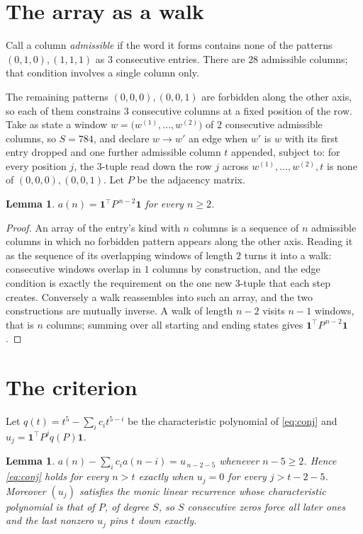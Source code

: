 \documentclass[11pt,a4paper]{article}
\theoremstyle{plain}
\newtheorem{lemma}[theorem]{Lemma}
\theoremstyle{definition}
\begin{document}
\section{The array as a walk}

Call a column \emph{admissible} if the word it forms contains none of the patterns
$(0,1,0), (1,1,1)$ as $3$ consecutive entries. There are $28$ admissible columns; that condition
involves a single column only.

The remaining patterns $(0,0,0), (0,0,1)$ are forbidden along the other axis, so each of them
constrains $3$ consecutive columns at a fixed position of the row. Take as state a
window $w=\bigl(w^{(1)},\dots,w^{(2)}\bigr)$ of $2$ consecutive admissible
columns, so $S=784$, and declare $w\to w'$ an edge when $w'$ is $w$ with its first entry
dropped and one further admissible column $t$ appended, subject to: for every position
$j$, the $3$-tuple read down the row $j$ across $w^{(1)},\dots,w^{(2)},t$
is none of $(0,0,0), (0,0,1)$. Let $P$ be the adjacency matrix.

\begin{lemma}\label{lem:walk}
$a(n)=\mathbf{1}^{\!\top}P^{\,n-2}\mathbf{1}$ for every $n\ge2$.
\end{lemma}

\begin{proof}
An array of the entry's kind with $n$ columns is a sequence of $n$ admissible columns in
which no forbidden pattern appears along the other axis. Reading it as the sequence of its
overlapping windows of length $2$ turns it into a walk: consecutive windows overlap in
$1$ columns by construction, and the edge condition is exactly the requirement on the one
new $3$-tuple that each step creates. Conversely a walk reassembles into such an array,
and the two constructions are mutually inverse. A walk of length $n-2$ visits $n-1$
windows, that is $n$ columns; summing over all starting and ending states gives
$\mathbf{1}^{\!\top}P^{\,n-2}\mathbf{1}$.
\end{proof}

\section{The criterion}

Let $q(t)=t^{5}-\sum_i c_i t^{5-i}$ be the characteristic polynomial of
\eqref{eq:conj} and $u_j=\mathbf{1}^{\!\top}P^{j}q(P)\mathbf{1}$.

\begin{lemma}\label{lem:crit}
$a(n)-\sum_i c_i a(n-i)=u_{\,n-2-5}$ whenever $n-5\ge2$. Hence
\eqref{eq:conj} holds for every $n>t$ exactly when $u_j=0$ for every
$j>t-2-5$. Moreover $(u_j)$ satisfies the monic linear recurrence whose
characteristic polynomial is that of $P$, of degree $S$, so $S$ consecutive zeros force all
later ones and the last nonzero $u_j$ pins $t$ down exactly.
\end{lemma}
\end{document}
